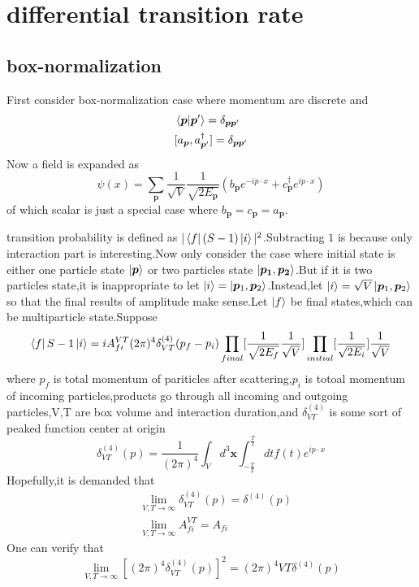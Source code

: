 \documentclass[a4paper]{article}
\begin{document}
\section{differential transition rate}
\subsection{box-normalization}
First consider box-normalization case where momentum are discrete and 
\begin{align*}
	&\braket{\bm{p}|\bm{p}'}=\delta_{\bm{p}\bm{p}'}\\
	&[a_{\bm{p}},a^{\dagger}_{\bm{p}'}]=\delta_{\bm{p}\bm{p}'}
\end{align*}
Now a field is expanded as$$\psi(x)=\sum_{\bm{p}}\frac{1}{\sqrt{V}}\frac{1}{\sqrt{2E_{\bm{p}}}}(b_{\bm{p}}e^{-ip\cdot x}+c^{\dagger}_{\bm{p}}e^{ip\cdot x})$$
of which scalar is just a special case where $b_{\bm{p}}=c_{\bm{p}}=a_{\bm{p}}$.
\par transition probability is defined as $|\bra{f}(S-1)\ket{i}|^2$.Subtracting $1$ is because only interaction part is interesting.Now only consider the case where initial state is either one particle state $\ket{\bm{p}}$ or two particles state $\ket{\bm{p_1},\bm{p_2}}$.But if it is two particles state,it is inappropriate to let $\ket{i}=\ket{\bm{p}_1,\bm{p}_2}$.Instead,let $\ket{i}=\sqrt{V}\ket{\bm{p}_1,\bm{p}_2}$ so that the final results of amplitude make sense.Let $\ket{f}$ be final states,which can be multiparticle state.Suppose$$\bra{f}S-1\ket{i}=iA_{fi}^{VT}(2\pi)^4\delta^{(4)}_{VT}(p_f-p_i)\prod_{final}[\frac{1}{\sqrt{2E_f}}\frac{1}{\sqrt{V}}]\prod_{initial}[\frac{1}{\sqrt{2E_i}}]\frac{1}{\sqrt{V}}$$
where $p_f$ is total momentum of pariticles after scattering,$p_i$ is totoal momentum of incoming particles,products go through all incoming and outgoing particles,V,T are box volume and interaction duration,and $\delta^{(4)}_{VT}$ is some sort of peaked function center at origin$$\delta^{(4)}_{VT}(p)=\frac{1}{(2\pi)^4}\int_V d^3\bm{x}\int_{-\frac{T}{2}}^{\frac{T}{2}} dtf(t)e^{ip\cdot x}$$Hopefully,it is demanded that
\begin{align*}
	&\lim_{V,T\rightarrow\infty}\delta^{(4)}_{VT}(p)=\delta^{(4)}(p)\\
	&\lim_{V,T\rightarrow\infty}A_{fi}^{VT}=A_{fi}
\end{align*}
One can verify that$$\lim_{V,T\rightarrow\infty}[(2\pi)^4\delta^{(4)}_{VT}(p)]^2=(2\pi)^4VT\delta^{(4)}(p)$$
\end{document}

